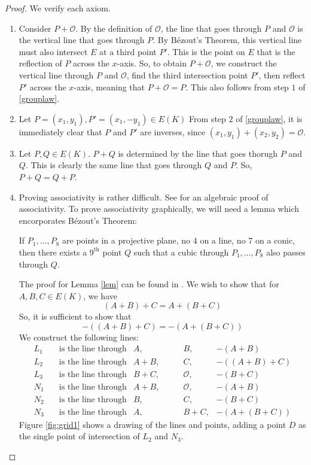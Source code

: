 \documentclass[]{../../math_paper}
\begin{document}
\begin{proof} We verify each axiom.
    \begin{enumerate} [label = (\roman*)]
        \item Consider $P + \mathcal{O}$. By the definition of $\mathcal{O}$, the line that goes through $P$ and $\mathcal{O}$ is the vertical line that goes through $P$. By Bézout's Theorem, this vertical line must also intersect $E$ at a third point $P'$. This is the point on $E$ that is the reflection of $P$ across the $x$-axis. So, to obtain $P + \mathcal{O}$, we construct the vertical line through $P$ and $\mathcal{O}$, find the third intersection point $P'$, then reflect $P'$ across the $x$-axis, meaning that $P + \mathcal{O} = P.$ This also follows from step $1$ of \ref{grouplaw}.
        \item Let $P = (x_1, y_1), P' = (x_1, -y_1) \in E(K)$ From step $2$ of \ref{grouplaw}, it is immediately clear that $P$ and $P'$ are inverses, since $(x_1, y_1) + (x_2, y_2) = \mathcal{O}$.
        \item Let $P, Q \in E(K)$. $P + Q$ is determined by the line that goes thorugh $P$ and $Q$. This is clearly the same line that goes through $Q$ and $P$. So, $P + Q = Q + P$.
        \item Proving associativity is rather difficult. See \cite{fujii} for an algebraic proof of associativity. To prove associativity graphically, we will need a lemma which encorporates Bézout's Theorem:
              \begin{lemma} \label{lem}
                  If $P_1, \ldots, P_8$ are points in a projective plane, no $4$ on a line, no $7$ on a conic, then there exists a $9^{\text{th}}$ point $Q$ such that a cubic through $P_1, \ldots, P_8$ also passes through $Q$.
              \end{lemma}
              The proof for Lemma \ref{lem} can be found in \cite{cassels_1991}. We wish to show that for $A, B, C \in E(K)$, we have $$(A + B) + C = A + (B + C)$$
              So, it is sufficient to show that
              $$-((A + B) + C ) = -(A + (B + C))$$
              We construct the following lines:
              \begin{align*}
                  L_1 & \quad \text{is the line through}  & A,\qquad      & B,           & -(A + B)       \\
                  L_2 & \quad \text{is the line through}  & A + B, \qquad & C,           & -((A + B) + C) \\
                  L_3 & \quad  \text{is the line through} & B + C, \qquad & \mathcal{O}, & -(B + C)       \\
                  N_1 & \quad \text{is the line through}  & A + B,\qquad  & \mathcal{O}, & -(A + B)       \\
                  N_2 & \quad \text{is the line through}  & B, \qquad     & C,           & -(B + C)       \\
                  N_3 & \quad \text{is the line through}  & A, \qquad     & B+C,         & -(A + (B + C))
              \end{align*}
              Figure \ref{fig:grid1} shows a drawing of the lines and points, adding a point $D$ as the single point of intersection of $L_2$ and $N_3$.


\end{enumerate}
\end{proof}
\end{document}
